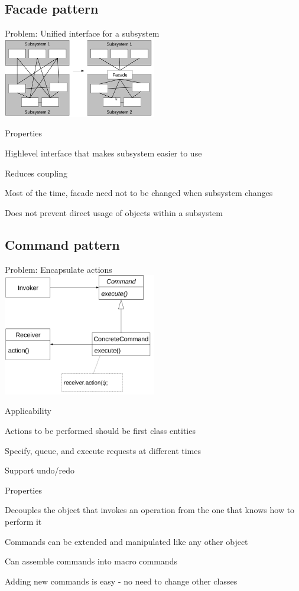 \subsection{Facade pattern}
\enumstart
	\item Problem: Unified interface for a subsystem
	\\ \includegraphics[width=0.5\textwidth]{img/facade_pattern.png}
	\item Properties
	\enumstart
		\item Highlevel interface that makes subsystem easier to use
		\item Reduces coupling
		\item Most of the time, facade need not to be changed when subsystem changes
		\item Does not prevent direct usage of objects within a subsystem
	\enumend
\enumend

\subsection{Command pattern}
\enumstart
	\item Problem: Encapsulate actions
	\\ \includegraphics[width=0.5\textwidth]{img/command_pattern.png}
	\item Applicability
	\enumstart
		\item Actions to be performed should be first class entities
		\item Specify, queue, and execute requests at different times
		\item Support undo/redo
	\enumend
	\item Properties
	\enumstart
		\item Decouples the object that invokes an operation from the one that knows how to perform it
		\item Commands can be extended and manipulated like any other object
		\item Can assemble commands into macro commands
		\item Adding new commands is easy - no need to change other classes
	\enumend
\enumend

